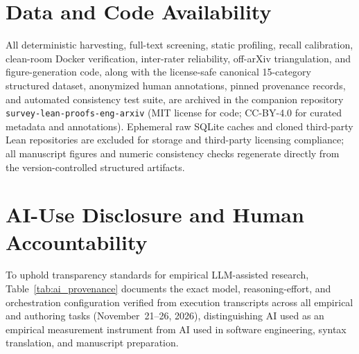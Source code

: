 \documentclass[11pt,letterpaper]{article}
\begin{document}
\section*{Data and Code Availability}
All deterministic harvesting, full-text screening, static profiling, recall calibration, clean-room Docker verification, inter-rater reliability, off-arXiv triangulation, and figure-generation code, along with the license-safe canonical 15-category structured dataset, anonymized human annotations, pinned provenance records, and automated consistency test suite, are archived in the companion repository \texttt{survey-lean-proofs-eng-arxiv} (MIT license for code; CC-BY-4.0 for curated metadata and annotations). Ephemeral raw SQLite caches and cloned third-party Lean repositories are excluded for storage and third-party licensing compliance; all manuscript figures and numeric consistency checks regenerate directly from the version-controlled structured artifacts.

\section*{AI-Use Disclosure and Human Accountability}
To uphold transparency standards for empirical LLM-assisted research, Table~\ref{tab:ai_provenance} documents the exact model, reasoning-effort, and orchestration configuration verified from execution transcripts across all empirical and authoring tasks (November~21--26, 2026), distinguishing AI used as an empirical measurement instrument from AI used in software engineering, syntax translation, and manuscript preparation.
\end{document}
